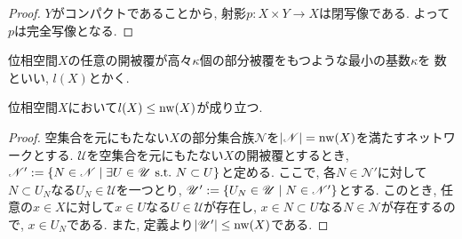 \documentclass[uplatex, dvipdfmx, a4paper, 12pt, class=jsbook, crop=false]{standalone}
\begin{document}
\begin{proof}
	$ Y $がコンパクトであることから, 射影$ p \colon X \times Y \to X $は閉写像である. よって$ p $は完全写像となる.
\end{proof}

\begin{definition}
	位相空間$ X $の任意の開被覆が高々$ \kappa $個の部分被覆をもつような最小の基数$\kappa$を \Lindelof 数といい, $ l(X) $とかく.
\end{definition}

\begin{proposition}
	位相空間$ X $において$ l(X) \leq \mathrm{nw}(X) $が成り立つ.
\end{proposition}

\begin{proof}
	空集合を元にもたない$ X $の部分集合族$ \mathscr{N} $を$ \left|\mathscr{N}\right| = \mathrm{nw}(X) $を満たすネットワークとする. $ \mathscr{U} $を空集合を元にもたない$ X $の開被覆とするとき, $ \mathscr{N}' \defeq \setcomp{N \in \mathscr{N}}{\exists U \in \mathscr{U} \ \mathrm{s.t.} \ N \subset U} $と定める. ここで, 各$ N \in \mathscr{N}' $に対して$ N \subset U_N $なる$ U_N \in \mathscr{U} $を一つとり, $ \mathscr{U}' \defeq \setcomp{U_N \in \mathscr{U}}{N \in \mathscr{N}'} $とする. このとき, 任意の$ x \in X $に対して$ x \in U $なる$ U \in \mathscr{U} $が存在し, $ x \in N \subset U $なる$ N \in \mathscr{N} $が存在するので, $ x \in U_N $である. また, 定義より$ \left|\mathscr{U}'\right| \leq \mathrm{nw}(X) $である.
\end{proof}
\end{document}
